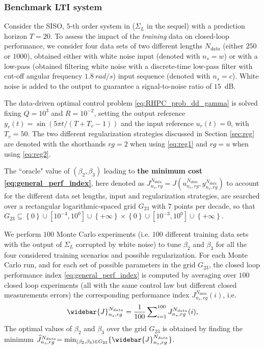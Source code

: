 \documentclass[letterpaper, 10 pt, conference]{ieeeconf}  %
\begin{document}
\subsubsection{Benchmark LTI system}
Consider the SISO, %
$5$-th order %
system in \cite{LandauReyKarimi1995} ($\Sigma_{L}$ in the sequel) with a prediction horizon $T=20$. %
To assess the impact of the \emph{training} data  on closed-loop performance, we consider four data sets of two different lengths $N_{data}$ (either $250$ or $1000$), obtained either with white noise input (denoted with $n_s=w$) or with a low-pass   (obtained filtering white noise with  a discrete-time low-pass filter with cut-off angular frequency $1.8~rad/s$) input sequence (denoted with $n_s=c$).
White noise is added to the output to guarantee  a signal-to-noise ratio of $15$~dB.


The data-driven optimal control problem \eqref{eq:RHPC_prob_dd_gamma} is solved  
fixing $Q = 10^{3}$ and $R = 10^{-2}$,
setting the output reference $y_{r}(t) = \sin(5\pi t/(T+T_{v}-1))$ and the input reference $u_r(t) = 0$, with $T_{v} = 50$. The two different regularization strategies discussed in Section \ref{sec:reg} are denoted with the shorthands $rg=2$ when using \eqref{eq:reg1} and  $rg=u$ when using \eqref{eq:reg2}.

The ``oracle" value of $(\beta_2,\beta_3)$ leading to \textbf{the minimum cost \eqref{eq:general_perf_index}}, here denoted as $J_{n_s,rg}^{N_{data}}= J(u^{N_{data}}_{n_s,rg},y^{N_{data}}_{n_s,rg})$ to account for the different data set lengths, input and regularization strategies, are searched over a rectangular logarithmic-spaced grid $G_{23}$ with $7$ points per decade, %
so that $G_{23} \subseteq \left\lbrace 0 \right\rbrace \cup [10^{-4}, 10^{0}] \cup \left\lbrace +\infty \right\rbrace \times \left\lbrace 0 \right\rbrace \cup [10^{-3},10^{0}] \cup \left\lbrace +\infty \right\rbrace$.

We perform $100$ Monte Carlo experiments (i.e. $100$ different training data sets with the output of  $\Sigma_L$ corrupted by white noise) to tune $\beta_2$ and $\beta_3$
for all the four considered training scenarios and possible regularization. For each Monte Carlo run, and for each set of possible parameters in the grid $G_{23}$,  the closed loop performance index  \eqref{eq:general_perf_index} is computed by averaging over $100$ closed loop experiments  (all with the same control law but different closed measurements errors) the corresponding performance index $J^{N_{data}}_{n_s,rg}(i)$, i.e.  
\begin{equation}\label{eq:avg_index}
	{\widebar{J}^{N_{data}}_{n_s,rg}} = \frac{1}{100}\sum\nolimits_{i=1}^{100}	J^{N_{data}}_{n_s,rg}(i),
\end{equation}
The  optimal values of $\beta_2$ and $\beta_3$  over the grid $G_{23}$ is obtained by finding the minimum $\widehat{J}^{N_{data}}_{n_s,rg} {=\min_{(\beta_2,\beta_3) \in G_{23}} \{\widebar{J}^{N_{data}}_{n_s,rg}\}}$. 
\end{document}
